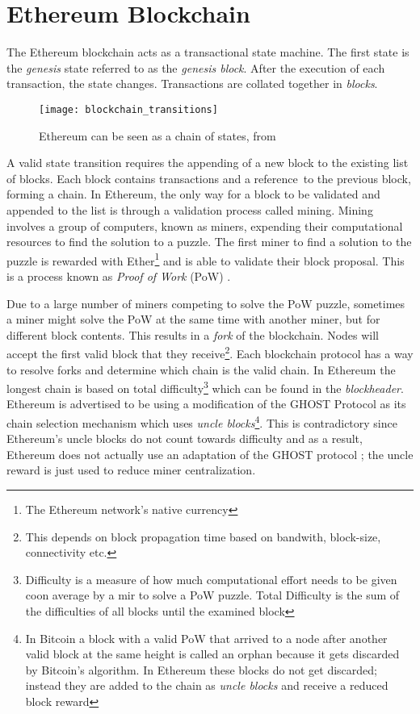 \section{Ethereum Blockchain}
The Ethereum blockchain acts as a transactional state machine. The first state is the \textit{genesis} state referred to as the \textit{genesis block}. After the execution of each transaction, the state changes. Transactions are collated together in \textit{blocks}. 

\begin{figure}[H]
    \centering
    \texttt{[image: blockchain\_transitions]}
    \caption{Ethereum can be seen as a chain of states, from~\cite{visual}}
    \label{fig:worldstate_update}
\end{figure}

A valid state transition requires the appending of a new block to the existing list of blocks. Each block contains transactions and a reference~to the previous block, forming a chain. In Ethereum, the only way for a block to be validated and appended to the list is through a validation process called mining. Mining involves a group of computers, known as miners, expending their computational resources to find the solution to a puzzle. The first miner to find a solution to the puzzle is rewarded with Ether\footnote{The Ethereum network's native currency} and is able to validate their block proposal. This is a process known as \textit{Proof of Work} (PoW) \cite{pow}. 

Due to a large number of miners competing to solve the PoW puzzle, sometimes a miner might solve the PoW at the same time with another miner, but for different block contents. This results in a \textit{fork} of the blockchain. Nodes will accept the first valid block that they receive\footnote{This depends on block propagation time based on bandwith, block-size, connectivity etc.}. Each blockchain protocol has a way to resolve forks and determine which chain is the valid chain. In Ethereum the longest chain is based on total difficulty\footnote{Difficulty is a measure of how much computational effort needs to be given coon average by a mir to solve a PoW puzzle. Total Difficulty is the sum of the difficulties of all blocks until the examined block} which can be found in the \textit{blockheader}. Ethereum is advertised to be using a modification of the GHOST Protocol\cite{GHOST} as its chain selection mechanism which uses \textit{uncle blocks}\footnote{In Bitcoin a block with a valid PoW that arrived to a node after another valid block at the same height is called an orphan because it gets discarded by Bitcoin's algorithm. In Ethereum these blocks do not get discarded; instead they are added to the chain as \textit{uncle blocks} and receive a reduced block reward}. This is contradictory since Ethereum's uncle blocks do not count towards difficulty and as a result, Ethereum does not actually use an adaptation of the GHOST protocol \cite{Gervais:2016:SPP:2976749.2978341}; the uncle reward is just used to reduce miner centralization.

